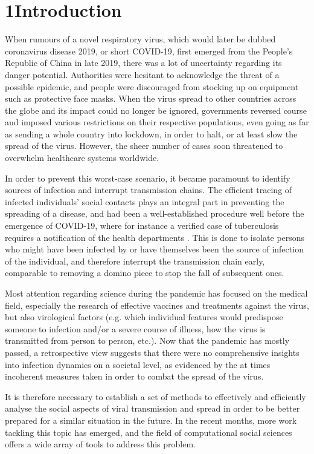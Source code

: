 \chapter{1\quad Introduction}
\label{ch:Introduction}

When rumours of a novel respiratory virus, which would later be dubbed coronavirus disease 2019, or short COVID-19, first emerged from the People's Republic of China in late 2019, there was a lot of uncertainty regarding its danger potential. Authorities were hesitant to acknowledge the threat of a possible epidemic, and people were discouraged from stocking up on equipment such as protective face masks. When the virus spread to other countries across the globe and its impact could no longer be ignored, governments reversed course and imposed various restrictions on their respective populations, even going as far as sending a whole country into lockdown, in order to halt, or at least slow the spread of the virus. However, the sheer number of cases soon threatened to overwhelm healthcare systems worldwide.

In order to prevent this worst-case scenario, it became paramount to identify sources of infection and interrupt transmission chains. The efficient tracing of infected individuals' social contacts plays an integral part in preventing the spreading of a disease, and had been a well-established procedure well before the emergence of COVID-19, where for instance a verified case of tuberculosis requires a notification of the health departments \cite{enwiki_1097839709}. This is done to isolate persons who might have been infected by or have themselves been the source of infection of the individual, and therefore interrupt the transmission chain early, comparable to removing a domino piece to stop the fall of subsequent ones.

Most attention regarding science during the pandemic has focused on the medical field, especially the research of effective vaccines and treatments against the virus, but also virological factors (e.g. which individual features would predispose someone to infection and/or a severe course of illness, how the virus is transmitted from person to person, etc.). Now that the pandemic has mostly passed, a retrospective view suggests that there were no comprehensive insights into infection dynamics on a societal level, as evidenced by the at times incoherent measures taken in order to combat the spread of the virus.

It is therefore necessary to establish a set of methods to effectively and efficiently analyse the social aspects of viral transmission and spread in order to be better prepared for a similar situation in the future. In the recent months, more work tackling this topic has emerged, and the field of computational social sciences offers a wide array of tools to address this problem.

